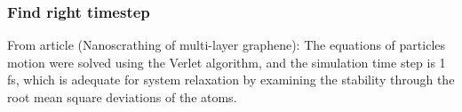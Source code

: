 

\subsubsection*{Find right timestep}
From article (Nanoscrathing of multi-layer graphene): The equations of particles motion were solved using the Verlet algorithm, and the simulation time step is 1 fs, which is adequate for system relaxation by examining the stability through the root mean square deviations of the atoms.